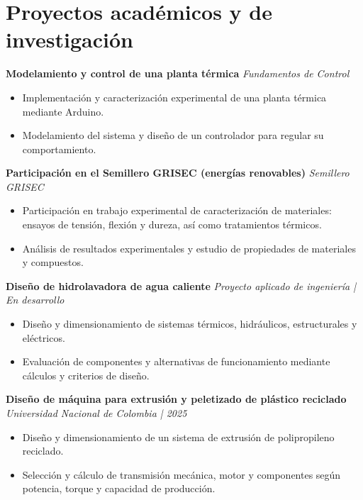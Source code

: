 \documentclass[9pt,letterpaper]{article}
\newcommand{\resumeProject}[2]{\textbf{#1} \hfill \textit{#2}\\[-1pt]}
\begin{document}
\section{Proyectos académicos y de investigación}
\resumeProject{Modelamiento y control de una planta térmica}{Fundamentos de Control}
\begin{itemize}
\item Implementación y caracterización experimental de una planta térmica mediante Arduino.
\item Modelamiento del sistema y diseño de un controlador para regular su comportamiento.
\end{itemize}
\resumeProject{Participación en el Semillero GRISEC (energías renovables)}{Semillero GRISEC}
\begin{itemize}
\item Participación en trabajo experimental de caracterización de materiales: ensayos de tensión, flexión y dureza, así como tratamientos térmicos.
\item Análisis de resultados experimentales y estudio de propiedades de materiales y compuestos.
\end{itemize}
\resumeProject{Diseño de hidrolavadora de agua caliente}{Proyecto aplicado de ingeniería | En desarrollo}
\begin{itemize}
\item Diseño y dimensionamiento de sistemas térmicos, hidráulicos, estructurales y eléctricos.
\item Evaluación de componentes y alternativas de funcionamiento mediante cálculos y criterios de diseño.
\end{itemize}
\resumeProject{Diseño de máquina para extrusión y peletizado de plástico reciclado}{Universidad Nacional de Colombia | 2025}
\begin{itemize}
\item Diseño y dimensionamiento de un sistema de extrusión de polipropileno reciclado.
\item Selección y cálculo de transmisión mecánica, motor y componentes según potencia, torque y capacidad de producción.
\end{itemize}
\end{document}
